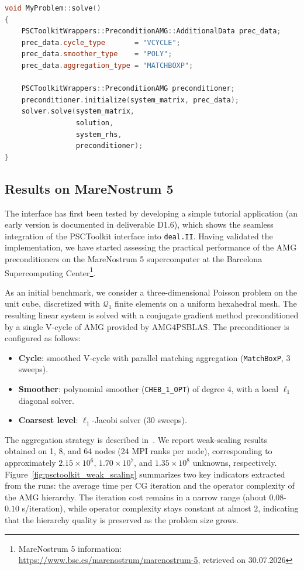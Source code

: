 \documentclass[a4paper,12pt]{article}
\begin{document}
\begin{lstlisting}[language=C++,caption={Preconditioned conjugate gradient solver class with PSCToolkit wrappers.}, label=lst:linear_solve]
void MyProblem::solve()
{
    PSCToolkitWrappers::PreconditionAMG::AdditionalData prec_data;
    prec_data.cycle_type       = "VCYCLE";
    prec_data.smoother_type    = "POLY";
    prec_data.aggregation_type = "MATCHBOXP";

    PSCToolkitWrappers::PreconditionAMG preconditioner;
    preconditioner.initialize(system_matrix, prec_data);
    solver.solve(system_matrix,
                 solution,
                 system_rhs,
                 preconditioner);
}
\end{lstlisting}

\subsection{Results on MareNostrum 5}

The interface has first been tested by developing a simple tutorial application (an early version is
documented in deliverable D1.6), which shows the seamless integration of the PSCToolkit interface into \texttt{deal.II}. Having validated the implementation, we have
started assessing the practical performance of the AMG preconditioners on the MareNostrum 5 supercomputer
at the Barcelona Supercomputing Center\footnote{MareNostrum 5 information: \url{https://www.bsc.es/marenostrum/marenostrum-5}, retrieved on 30.07.2026}.

As an initial benchmark, we consider a three-dimensional Poisson problem on the unit cube, discretized
with $\mathcal{Q}_1$ finite elements on a uniform hexahedral mesh. The resulting linear system is solved with a conjugate
gradient method preconditioned by a single V-cycle of AMG provided by AMG4PSBLAS. The preconditioner is configured
as follows:
\begin{itemize}
    \item \textbf{Cycle}: smoothed V-cycle with parallel matching aggregation (\texttt{MatchBoxP}, $3$ sweeps).
    \item \textbf{Smoother}: polynomial smoother (\texttt{CHEB\_1\_OPT}) of degree $4$, with a local $\ell_1$ diagonal solver.
    \item \textbf{Coarsest level}: $\ell_1$-Jacobi solver ($30$ sweeps).
\end{itemize}


The aggregation strategy is described in~\cite{BootCMatch}. We report weak-scaling results obtained on 1, 8, and 64 nodes (24 MPI ranks per node), corresponding to
approximately $2.15\times 10^6$, $1.70\times 10^7$, and $1.35\times 10^8$ unknowns, respectively.
Figure~\ref{fig:psctoolkit_weak_scaling} summarizes two key indicators extracted from the runs:
the average time per CG iteration and the operator complexity of the AMG hierarchy.
The iteration cost remains in a narrow range (about $0.08$-$0.10$ s/iteration), while operator complexity
stays constant at almost $2$, indicating that the hierarchy quality is preserved as the problem size grows.
\end{document}
